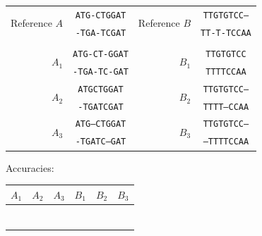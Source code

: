 \documentclass[11pt, oneside]{article}   	%
\begin{document}
\begin{enumerate}
\renewcommand{\arraystretch}{1}
\begin{center}
\begin{tabular}{r|c|r|c|}
\cline{2-2} \cline{4-4}
\multirow{2}{*}{Reference $A$} & \texttt{ATG-CTGGAT} & \multirow{2}{*}{Reference $B$} & \texttt{TTGTGTCC--}\\
& \texttt{-TGA-TCGAT} & & \texttt{TT-T-TCCAA}\\
\cline{2-2} \cline{4-4}
\multicolumn{3}{c}{}\\
\cline{2-2} \cline{4-4}
\multirow{2}{*}{$A_1$} & \texttt{ATG-CT-GGAT} & \multirow{2}{*}{$B_1$}  & \texttt{TTGTGTCC}\\
& \texttt{-TGA-TC-GAT} & & \texttt{TTTTCCAA}\\
\cline{2-2} \cline{4-4}
\multirow{2}{*}{$A_2$} & \texttt{ATGCTGGAT} &  \multirow{2}{*}{$B_2$}  & \texttt{TTGTGTCC--}\\
& \texttt{-TGATCGAT} & & \texttt{TTTT--CCAA}\\
\cline{2-2} \cline{4-4}
\multirow{2}{*}{$A_3$} & \texttt{ATG--CTGGAT} & \multirow{2}{*}{$B_3$}   & \texttt{TTGTGTCC--}\\
& \texttt{-TGATC--GAT} & & \texttt{--TTTTCCAA}\\
\cline{2-2} \cline{4-4}

\end{tabular}
\vspace{2em}

Accuracies:
\begin{tabular}{cccccc}
$A_1$ & $A_2$ & $A_3$ & $B_1$ & $B_2$ & $B_3$ \\
\hline
\multicolumn{1}{|c|}{~\hspace{3em}~} & \multicolumn{1}{|c|}{~\hspace{3em}~} & \multicolumn{1}{|c|}{~\hspace{3em}~} & \multicolumn{1}{||c|}{~\hspace{3em}~} & \multicolumn{1}{|c|}{~\hspace{3em}~} & \multicolumn{1}{|c|}{~\hspace{3em}~}\\
\multicolumn{1}{|c|}{} & \multicolumn{1}{|c|}{} & \multicolumn{1}{|c|}{} & \multicolumn{1}{||c|}{} & \multicolumn{1}{|c|}{} & \multicolumn{1}{|c|}{}\\
\multicolumn{1}{|c|}{} & \multicolumn{1}{|c|}{} & \multicolumn{1}{|c|}{} & \multicolumn{1}{||c|}{} & \multicolumn{1}{|c|}{} & \multicolumn{1}{|c|}{}\\
\hline
\end{tabular}



\end{center}
\end{enumerate}
\end{document}
